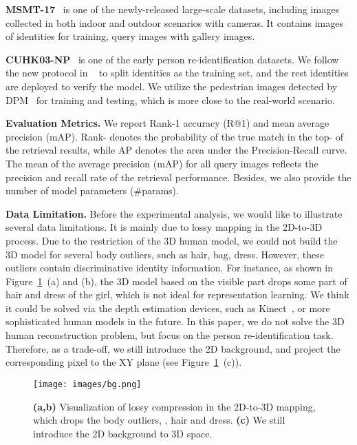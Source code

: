 \textbf{MSMT-17}~\cite{wei2018person} is one of the newly-released large-scale datasets, including  images collected in both indoor and outdoor scenarios with  cameras. It contains  images of  identities for training,  query images with  gallery images.

\textbf{CUHK03-NP}~\cite{li2014deepreid} is one of the early person re-identification datasets. We follow the new protocol in ~\cite{zhong2017re} to split  identities as the training set, and the rest  identities are deployed to verify the model. We utilize the pedestrian images detected by DPM~\cite{felzenszwalb2009object} for training and testing, which is more close to the real-world scenario.
 
\textbf{Evaluation Metrics.} We report Rank-1 accuracy (R@1) and mean average precision (mAP). Rank- denotes the probability of the true match in the  top- of the retrieval results, while AP denotes the
area under the Precision-Recall curve. The mean of the average precision (mAP) for all query images reflects the
precision and recall rate of the retrieval performance. Besides, we also provide the number of model parameters (\#params). 

\textbf{Data Limitation.} \label{sec:limitation}
Before the experimental analysis, we would like to illustrate several data limitations. It is mainly due to lossy mapping in the 2D-to-3D process.  Due to the restriction of the 3D human model, we could not build the 3D model for several body outliers, such as hair, bag, dress. However, these outliers contain discriminative identity information. For instance, as shown in Figure~\ref{fig:bg}~(a) and (b), the 3D model based on the visible part drops some part of hair and dress of the girl, which is not ideal for representation learning. We think it could be solved via the depth estimation devices, such as Kinect~\cite{han2013enhanced}, or more sophisticated human models in the future. In this paper, we do not solve the 3D human reconstruction problem, but focus on the person re-identification task. Therefore, as a trade-off, we still introduce the 2D background, and project the corresponding pixel to the XY plane (see Figure~\ref{fig:bg}~(c)).\begin{figure}{
\caption{\textbf{(a,b)} Visualization of lossy compression in the 2D-to-3D mapping, which drops the body outliers, \eg, hair and dress. \textbf{(c)} We still introduce the 2D background to 3D space. }\label{fig:bg}}{\texttt{[image: images/bg.png]}
}\end{figure} 

